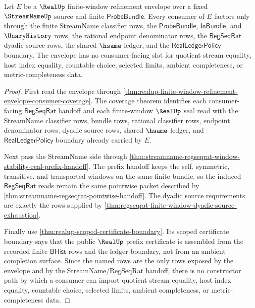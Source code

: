 \begin{theorem}
\label{thm:realup-finite-window-refinement-envelope-nonescape}
Let $E$ be a $\RealUp$ finite-window refinement envelope over a fixed
$\StreamNameUp$ source and finite $\mathsf{ProbeBundle}$. Every consumer of
$E$ factors only through the finite StreamName classifier rows, the
$\mathsf{ProbeBundle}$, $\mathsf{InBundle}$, and $\UnaryHistory$ rows, the
rational endpoint denominator rows, the $\mathsf{RegSeqRat}$ dyadic source
rows, the shared $\hsame$ ledger, and the
$\mathsf{RealLedgerPolicy}$ boundary. The envelope has no consumer-facing
slot for quotient stream equality, host index equality, countable choice,
selected limits, ambient completeness, or metric-completeness data.
\end{theorem}
\begin{proof}
First read the envelope through
\autoref{thm:realup-finite-window-refinement-envelope-consumer-coverage}. The
coverage theorem identifies each consumer-facing $\mathsf{RegSeqRat}$ handoff
and each finite-window $\RealUp$ seal read with the StreamName classifier
rows, bundle rows, rational classifier rows, endpoint denominator rows,
dyadic source rows, shared $\hsame$ ledger, and
$\mathsf{RealLedgerPolicy}$ boundary already carried by $E$.

Next pass the StreamName side through
\autoref{thm:streamname-regseqrat-window-stability-real-prefix-handoff}. The
prefix handoff keeps the self, symmetric, transitive, and transported
windows on the same finite bundle, so the induced $\mathsf{RegSeqRat}$ reads
remain the same pointwise packet described by
\autoref{thm:streamname-regseqrat-pointwise-handoff}. The dyadic source
requirements are exactly the rows supplied by
\autoref{thm:regseqrat-finite-window-dyadic-source-exhaustion}.

Finally use \autoref{thm:realup-scoped-certificate-boundary}. Its scoped
certificate boundary says that the public $\RealUp$ prefix certificate is
assembled from the recorded finite $\mathsf{BHist}$ rows and the ledger
boundary, not from an ambient completion surface. Since the named rows are
the only rows exposed by the envelope and by the StreamName/RegSeqRat
handoff, there is no constructor path by which a consumer can import quotient
stream equality, host index equality, countable choice, selected limits,
ambient completeness, or metric-completeness data.
\end{proof}
